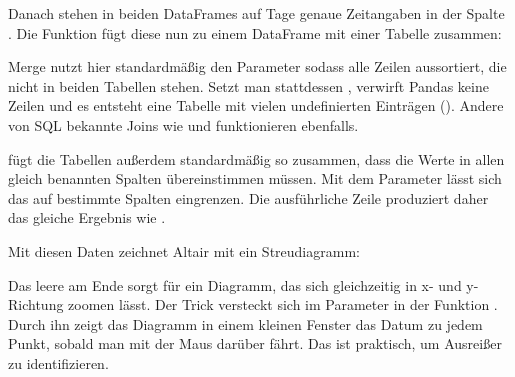 \medskip


Danach stehen in beiden DataFrames auf Tage genaue Zeitangaben in der Spalte . Die Funktion  fügt diese nun zu einem DataFrame mit einer Tabelle zusammen:

\medskip



\medskip

Merge nutzt hier standardmäßig den Parameter  sodass  alle Zeilen aussortiert, die nicht in beiden Tabellen stehen. Setzt man stattdessen , verwirft Pandas keine Zeilen und es entsteht eine Tabelle mit vielen undefinierten Einträgen (). Andere von SQL bekannte Joins wie  und  funktionieren ebenfalls.

 fügt die Tabellen außerdem standardmäßig so zusammen, dass die Werte in allen gleich benannten Spalten übereinstimmen müssen. Mit dem Parameter  lässt sich das auf bestimmte Spalten eingrenzen. Die ausführliche Zeile  produziert daher das gleiche Ergebnis wie .

Mit diesen Daten zeichnet Altair mit  ein Streudiagramm:

\medskip








\medskip

Das leere  am Ende sorgt für ein Diagramm, das sich gleichzeitig in x- und y-Richtung zoomen lässt. Der Trick versteckt sich im Parameter  in der Funktion . Durch ihn zeigt das Diagramm in einem kleinen Fenster das Datum zu jedem Punkt, sobald man mit der Maus darüber fährt. Das ist praktisch, um Ausreißer zu identifizieren.

